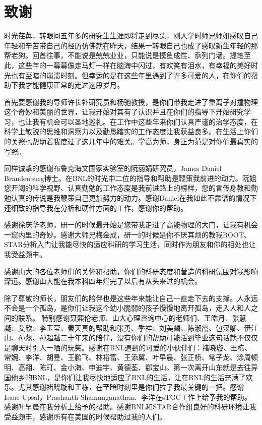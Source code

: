 \chapter{致谢}

时光荏苒，转眼间五年多的研究生生涯即将走到尽头，刚入学时师兄师姐感叹自己年轻和辛苦带自己的经历仿佛就在昨天，结果一转眼自己也成了感叹新生年轻的那帮老狗。回首往事，不能说是兢兢业业，只能说是摸鱼成性、忝列门墙。提笔至此，这些年的一幕幕像走马灯一样在脑海中闪过，有欢笑有泪水，有幸福的美好时光也有至暗的崩溃时刻。但幸运的是在这些年里遇到了许多可爱的人，在你们的帮助下我才能健康正常的走过这段岁月。

首先要感谢我的导师许长补研究员和杨驰教授，是你们带我走进了重离子对撞物理这个奇妙和美丽的世界，让我开始对其有了认识并且在你们的指导下开始研究学习，也让我有机会可以圣地巡礼。在工作中这些年来你们认真严谨的治学态度，在科学上敏锐的思维和洞察力以及勤恳踏实的工作态度让我获益良多。在生活上你们的关照也帮助着我度过了这几年中的难关。学高为师，身正为范是对你们最真实的写照。

同样诚挚的感谢布鲁克海文国家实验室的阮丽娟研究员，James Daniel Brandenburg博士。在BNL的时光中二位的指导和帮助是鞭策我前进的动力。阮姐您开阔的科学视野、认真勤勉的工作态度是我前进路上的榜样，您的言传身教和勤勉认真的传说是我鞭策自己更加努力的动力。感谢Daniel在我如此不靠谱的情况下还细致的指导我在分析和硬件方面的工作，感谢你的帮助。

感谢徐庆华老师，研一的时候最开始是您带我走进了高能物理的大门，让我有机会一窥内里的奇妙。感谢大师兄梅金成，研一的时候是你不厌其烦的教我ROOT、STAR分析入门让我能尽快的适应科研的学习生活，同时作为朋友和你的相处也让我受益颇丰。

感谢山大的各位老师们的关怀和帮助，你们的科研态度和营造的科研氛围对我影响深远。感谢山大能在我本科四年烂完了以后有从头来过的机会。

除了尊敬的师长，朋友们的陪伴也是这些年来能让自己一直走下去的支撑。人永远不会是一个孤岛，是你们让我这个幼小脆弱的孩子慢慢地离开孤岛，走入人和人之间的联系。
特别感谢聂熙伦老师、山大心理咨询中心的老师们、王皓月、张慧凝、艾欣、李玉莹、秦天真的帮助和张勇、季祥、刘美麟、陈淑霞、包汉卿、伊江山、孙蕊、孙超越二十年来的陪伴，没有你们的帮助可能活到毕业这句话就不仅仅是聊天时引人一哂的玩笑。感谢在BNL遇到的可爱的小伙伴们：褚晓璇、王栋、常婉、李洋、胡昱、王鹏飞、林裕富、王添翼、叶早晨、张正桥、常子龙、涂周顿明、高翔、陈玎、金小海、申迪宇、黄德荃、郗宝山。第一次离开山东就是去往异国他乡的BNL，是你们让我尽快地适应了BNL的生活，让在BNL的生活充满了欢乐。尤其感谢褚晓璇和王栋，在至暗时刻里是你们拉了我最关键的一把。感谢Isaac Upsal，Prashanth Shanmuganathan、李洋在sTGC工作上给予我的帮助。感谢叶早晨在我分析上给予的帮助。感谢BNL和STAR合作组良好的科研环境让我受益颇丰，感谢所有在美国的时候帮助过我的人们。

